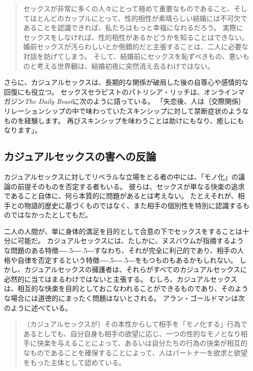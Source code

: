 \documentclass[paper=a4,book,openany]{jlreq}
\newcommand{\ig}[1]{}           %
\def\DDASH{―\kern-.5\zw―\kern-.5\zw―} %
\begin{document}
\begin{quote}
  セックスが非常に多くの人々にとって極めて重要なものであること、そしてほとんどのカップルにとって、性的相性が素晴らしい結婚には不可欠であることを認識できれば、私たちはもっと幸福になれるだろう。
実際にセックスをしなければ、性的相性があるかどうかを知ることはできない。
婚前セックスが汚らわしいとか倒錯的だと主張することは、二人に必要な対話を妨げてしまう。
そして、結婚前にセックスを恥ずべきもの、悪いものと考える世界観は、結婚初夜に突然消え去るわけではない。
\citep{filipovic12:_moral_case_sex_marr}
\end{quote}

さらに、カジュアルセックスは、長期的な関係が破局した後の自尊心や感情的な回復にも役立つ。
セックスセラピストのパトリシア・リッチは、オンラインマガジン\emph{The Daily Beast}に次のように語っている。
「失恋後、人は｛交際関係｝{リレーションシップ}の中で味わっていたスキンシップに対して禁断症状のようなものを経験します。
再びスキンシップを味わうことは助けにもなり、癒しにもなります」\citep{shire14:_peop_who_have}。

\subsection{カジュアルセックスの害への反論}

カジュアルセックスに対してリベラルな立場をとる者の中には、「モノ化」の議論の前提そのものを否定する者もいる。
彼らは、セックスが単なる快楽の追求であること自体に、何ら本質的に問題があるとは考えない。
たとえそれが、相手との物語的歴史に基づくものではなく、また相手の個別性を特別に認識するものではなかったとしてもだ。

二人の人間が、単に身体的満足を目的として合意の下でセックスをすることは十分に可能だ。
カジュアルセックスには、たしかに、ヌスバウムが指摘するような問題のある特徴{\DDASH}すなわち、それが完全に利己的であり、相手の人格や自律を否定するという特徴{\DDASH}をもつものもあるかもしれない。
しかし、カジュアルセックスの擁護者は、それらがすべてのカジュアルセックスに必然的に当てはまるわけではないと主張する。
むしろ、カジュアルセックスは、相互的な快楽を目的としておこなわれることができるものであり、そのような場合には道徳的にまったく問題はないとされる。
アラン・ゴールドマンは次のように述べている。

\begin{quote}
〔カジュアルセックスが〕その本性からして相手を「モノ化する」行為であるとしても、自分自身も相手の欲望に応じ、一つの性的なモノとなり相手に快楽を与えることによって、あるいは自分たちの行為の快楽が相互的なものであることを確保することによって、人はパートナーを欲求と欲望をもった主体として認めている。
\citep[p.283]{goldman77:_plain_sex}\ig{Alan Goldman}
\end{quote}
\end{document}
